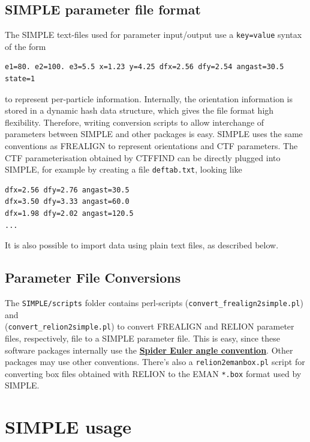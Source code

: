 \documentclass[a4paper,11pt]{article}
\begin{document}
\subsection{SIMPLE parameter file format}
The SIMPLE text-files used for parameter input/output use a \texttt{key=value} syntax of the form
\begin{Verbatim}[commandchars=+\[\],fontsize=\small,breaklines=true]
e1=80. e2=100. e3=5.5 x=1.23 y=4.25 dfx=2.56 dfy=2.54 angast=30.5 state=1
\end{Verbatim}
to represent per-particle information. Internally, the orientation information is stored in a dynamic hash data structure, which gives the file format high flexibility. Therefore, writing conversion scripts to allow interchange of parameters between SIMPLE and other packages is easy. SIMPLE uses the same conventions as FREALIGN \citep{Grigorieff:2007aa} to represent orientations and CTF parameters. The CTF parameterisation obtained by CTFFIND \citep{Mindell:2003aa} can be directly plugged into SIMPLE, for example by creating a file \texttt{deftab.txt}, looking like
\begin{Verbatim}[commandchars=+\[\],fontsize=\small,breaklines=true]
dfx=2.56 dfy=2.76 angast=30.5
dfx=3.50 dfy=3.33 angast=60.0
dfx=1.98 dfy=2.02 angast=120.5
...
\end{Verbatim}
It is also possible to import data using plain text files, as described below.

\subsection{Parameter File Conversions}
The \texttt{SIMPLE/scripts} folder contains perl-scripts (\texttt{convert\_frealign2simple.pl}) and\\ (\texttt{convert\_relion2simple.pl}) to convert FREALIGN and RELION parameter files, respectively, file to a SIMPLE parameter file. This is easy, since these software packages internally use the \href{http://spider.wadsworth.org/spider_doc/spider/docs/euler.html}{\textbf{\textcolor{BurntOrange}{Spider Euler angle convention}}}. Other packages may use other conventions. There's also a \texttt{relion2emanbox.pl} script for converting box files obtained with RELION to the EMAN \texttt{*.box} format used by SIMPLE.



\section{SIMPLE usage}
\end{document}
